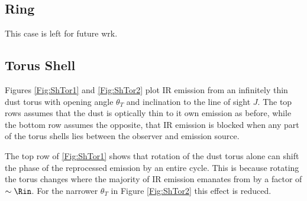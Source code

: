 \subsection{Ring}
This case is left for future wrk.
















\subsection{Torus Shell} 
Figures \ref{Fig:ShTor1} and \ref{Fig:ShTor2} plot IR emission from an
infinitely thin dust torus with opening angle $\theta_T$ and inclination to
the line of sight $J$. The top rows assumes that the dust is optically thin to
it own emission as before, while the bottom row assumes the opposite, that IR
emission is blocked when any part of the torus shells lies between the observer
and emission source.

The top row of \ref{Fig:ShTor1} shows that rotation of the dust torus alone
can shift the phase of the reprocessed emission by an entire cycle. This is
because rotating the torus changes where the majority of IR emission emanates
from by a factor of $\sim \Rin$. For the narrower $\theta_T$ in Figure
\ref{Fig:ShTor2} this effect is reduced.



